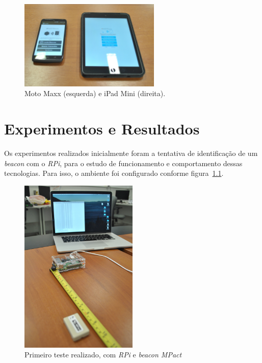 \documentclass[
		12pt,				%
		openright,			%
		oneside,			%
		a4paper,			%
		chapter=TITLE,		%
		english,			%
		brazil				%
	]{abntex2}
\begin{document}
\begin{figure}[htb]
	\caption{\label{fig:motomaxx-ipad}Moto Maxx (esquerda) e iPad Mini (direita).}
	\begin{center}
		\includegraphics[width=0.6\textwidth]{img/motomaxx-ipad.jpg}
	\end{center}
\end{figure}



\chapter{Experimentos e Resultados}

Os experimentos realizados inicialmente foram a tentativa de identificação de um \textit{beacon} com o \textit{RPi}, para o estudo de funcionamento e comportamento dessas tecnologias. Para isso, o ambiente foi configurado conforme figura~\ref{fig:inicio-ambiente}. 

\begin{figure}[htb]
	\caption{\label{fig:inicio-ambiente}Primeiro teste realizado, com \textit{RPi} e \textit{beacon MPact}}
	\begin{center}
		\includegraphics[width=0.5\textwidth]{img/ambiente1.jpg}
	\end{center}
\end{figure}
\end{document}
